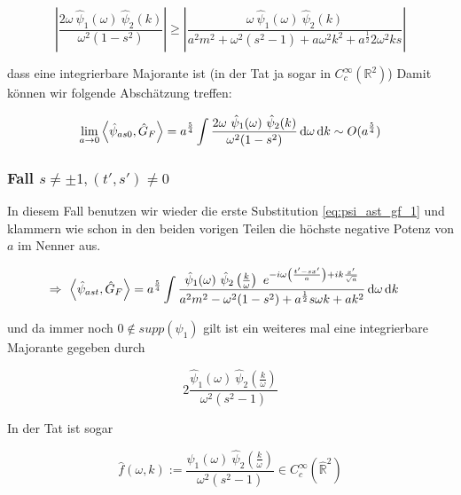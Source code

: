 \begin{equation*}
    \left|
        \frac{2 \omega ~\hat \psi_1(\omega) ~\hat \psi_2(k)}{\omega^2 (1-s^2)}
    \right|
    \geq
    \left|
        \frac{
        \omega ~\hat \psi_1(\omega) ~\hat \psi_2(k)
    }
    {
        a^2 m^2+\omega^2 (s^2-1) + a \omega^2 k^2 + a^{\frac{1}{2}}2 \omega^2 k s
    }
    \right|
\end{equation*}

dass eine integrierbare Majorante ist (in der Tat ja sogar in $C_c^\infty (\mathbb{R}^2)$)
Damit können wir folgende Abschätzung treffen:

\begin{equation*}
    \lim_{a \rightarrow 0} \left< \hat\psi_{as0}, \hat G_F \right> =
    a^{\frac{5}{4}} \int \frac{2 \omega ~\hat \psi_1(\omega) ~\hat \psi_2(k)}
    {\omega^2 (1-s^2)}
    \mathop{}\!\mathrm{d} \omega \mathop{}\!\mathrm{d} k
    \sim O(a^{\frac{5}{4}})
\end{equation*}


\subsubsection*{Fall $s \neq \pm 1, (t', s') \neq 0$}
In diesem Fall benutzen wir wieder die erste Substitution \eqref{eq:psi_ast_gf_1}
und klammern wie schon in den beiden vorigen Teilen die höchste negative
Potenz von $a$ im Nenner aus.

\begin{align}
\Rightarrow ~
    \left< \hat\psi_{ast}, \hat G_F \right>
    &=
    a^{\frac{5}{4}} \int \frac{
        \hat \psi_1 (\omega) ~\hat \psi_2 \left(\frac{k}{\omega}\right)
        ~ e^{-i \omega \left(\frac{t'-sx'}{a}\right) + i k \frac{x'}{\sqrt{a}}}
    }
    {
        a^2 m^2 - \omega^2 (1-s^2) + a^{\frac{1}{2}} s \omega k +a k^2
    }
    \mathop{}\!\mathrm{d} \omega \mathop{}\!\mathrm{d} k
\end{align}

und da immer noch $0 \notin supp(\psi_1)$ gilt ist ein weiteres mal eine integrierbare Majorante gegeben durch

\begin{equation}
    2\frac{\hat \psi_1 (\omega)~\hat\psi_2 \left(\frac{k}{\omega}\right)}
    {\omega^2(s^2-1)}
\end{equation}

In der Tat ist sogar

\begin{equation}
    \hat f(\omega, k) := \frac{\hat \psi_1 (\omega)~\hat\psi_2 \left(\frac{k}{\omega}\right)}
    {\omega^2(s^2-1)}
    \in C_c^\infty (\hat{\mathbb{R}}^2)
\end{equation}

